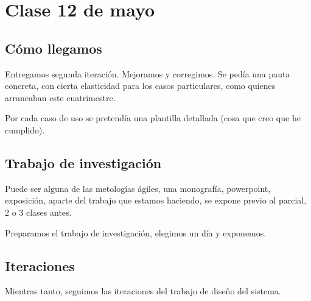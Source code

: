 \section{Clase 12 de mayo}

\subsection{Cómo llegamos}

Entregamos segunda iteración.
Mejoramos y corregimos.
Se pedía una pauta concreta,
con cierta elasticidad para los casos particulares,
como quienes arrancaban este cuatrimestre.

Por cada caso de uso se pretendía una plantilla detallada
(cosa que creo que he cumplido).

\subsection{Trabajo de investigación}

Puede ser alguna de las metologías ágiles,
una monografía,
powerpoint,
exposición,
aparte del trabajo que estamos haciendo,
se expone previo al parcial,
2 o 3 clases antes.

Preparamos el trabajo de investigación,
elegimos un día y exponemos.

\subsection{Iteraciones}

Mientras tanto,
seguimos las iteraciones del trabajo de diseño del sistema.
